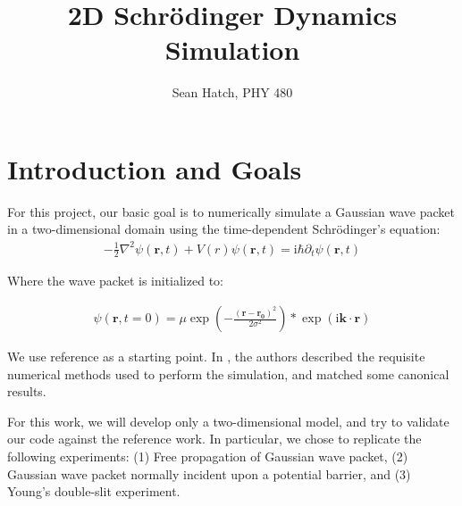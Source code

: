 \documentclass[letterpaper,12pt]{article}
\title{2D Schr\"{o}dinger Dynamics Simulation}
\author{Sean Hatch, PHY 480}
\begin{document}
	\renewcommand{\topfraction}{0.9}	%
    \renewcommand{\bottomfraction}{0.8}	%
    \setcounter{topnumber}{2}
    \setcounter{bottomnumber}{2}
    \setcounter{totalnumber}{2}     %
    \setcounter{dbltopnumber}{2}    %
    \renewcommand{\dbltopfraction}{0.9}	%
    \renewcommand{\textfraction}{0.07}	%
    \renewcommand{\floatpagefraction}{0.7}	%
    \renewcommand{\dblfloatpagefraction}{0.7}	%


\maketitle

\section{Introduction and Goals}

For this project, our basic goal is to numerically simulate a Gaussian wave packet in a two-dimensional domain using the time-dependent Schr\"{o}dinger's equation:
\begin{equation}
\begin{split}
- \frac{1}{2}\nabla^2 \psi(\mathbf{r},t) + V(r)\psi(\mathbf{r},t) = \mathrm{i}\hbar\partial_t\psi(\mathbf{r},t)
\end{split}
\end{equation}

Where the wave packet is initialized to:

\begin{equation}
\begin{split}
\psi(\mathbf{r},t = 0) = \mu\exp( - \frac{(\mathbf{r} - \mathbf{r_0})^2}{2\sigma^2} )*\exp(\mathrm{i}\mathbf{k}\cdot\mathbf{r})
\end{split}
\end{equation}


We use reference \citep{reference} as a starting point. In \citep{reference}, the authors described the requisite numerical methods used to perform the simulation, and matched some canonical results.

For this work, we will develop only a two-dimensional model, and try to validate our code against the reference work.  In particular, we chose to replicate the following experiments: (1) Free propagation of Gaussian wave packet, (2) Gaussian wave packet normally incident upon a potential barrier, and (3) Young's double-slit experiment. 
\end{document}
